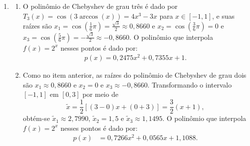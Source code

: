 \documentclass[12pt,a4paper]{article}
\begin{document}
\begin{enumerate}
\item \begin{enumerate}
   \item O polinômio de Chebyshev de grau três é dado por $T_3(x) = \cos(3\arccos(x)) = 4 x^3 - 3x$ para $x \in [-1, 1]$, e suas raízes são $x_1 = \cos\left(\frac{1}{6}\pi\right) = \frac{\sqrt{3}}{2} \approx 0,8660$ e $x_2 = \cos\left(\frac{3}{6}\pi\right) = 0$ e $x_3 = \cos\left(\frac{5}{6}\pi\right) = - \frac{\sqrt{3}}{2} \approx -0,8660$. O polinômio que interpola $f(x) = 2^x$ nesses pontos é dado por:
   \begin{align*}
      p(x)
      = 0,2475x^2 + 0,7355x + 1.
   \end{align*}
   \item Como no item anterior, as raízes do polinômio de Chebyshev de grau dois são $x_1 \approx 0,8660$ e $x_2 = 0$ e $x_3 \approx -0,8660$. Transformando o intervalo $[-1, 1]$ em $[0, 3]$ por meio de
   \[
   \tilde{x} = \frac{1}{2}[(3 - 0) x + (0 + 3)] = \frac{3}{2}(x + 1),
   \]
   obtém-se $\tilde{x}_1 \approx 2,7990$, $\tilde{x}_2 = 1,5$ e $\tilde{x}_3 \approx 1,1495$. O polinômio que interpola $f(x) = 2^x$ nesses pontos é dado por:
   \begin{align*}
      p(x)
      & = 0,7266x^2 + 0,0565x + 1,1088.
   \end{align*}
\end{enumerate}


\end{enumerate}
\end{document}
